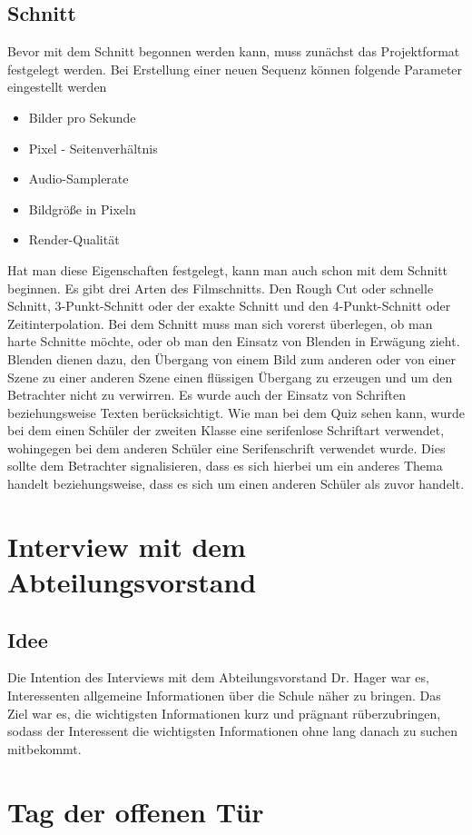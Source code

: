 \subsection{Schnitt}
Bevor mit dem Schnitt begonnen werden kann, muss zunächst das Projektformat festgelegt werden. Bei Erstellung einer neuen Sequenz können folgende Parameter eingestellt werden
\begin{itemize}
	\item Bilder pro Sekunde
	\item Pixel - Seitenverhältnis
	\item Audio-Samplerate
	\item Bildgröße in Pixeln
	\item Render-Qualität
\end{itemize}
Hat man diese Eigenschaften festgelegt, kann man auch schon mit dem Schnitt beginnen. Es gibt drei Arten des Filmschnitts. Den Rough Cut oder schnelle Schnitt, 3-Punkt-Schnitt oder der exakte Schnitt und den 4-Punkt-Schnitt oder Zeitinterpolation. Bei dem Schnitt muss man sich vorerst überlegen, ob man harte Schnitte möchte, oder ob man den Einsatz von Blenden in Erwägung zieht. Blenden dienen dazu, den Übergang von einem Bild zum anderen oder von einer Szene zu einer anderen Szene einen flüssigen Übergang zu erzeugen und um den Betrachter nicht zu verwirren.
Es wurde auch der Einsatz von Schriften beziehungsweise Texten berücksichtigt. Wie man bei dem Quiz sehen kann, wurde bei dem einen Schüler der zweiten Klasse eine serifenlose Schriftart verwendet, wohingegen bei dem anderen Schüler eine Serifenschrift verwendet wurde. Dies sollte dem Betrachter signalisieren, dass es sich hierbei um ein anderes Thema handelt beziehungsweise, dass es sich um einen anderen Schüler als zuvor handelt.
\section{Interview mit dem Abteilungsvorstand}
\subsection{Idee}
Die Intention des Interviews mit dem Abteilungsvorstand Dr. Hager war es, Interessenten allgemeine Informationen über die Schule näher zu bringen. Das Ziel war es, die wichtigsten Informationen kurz und prägnant rüberzubringen, sodass der Interessent die wichtigsten Informationen ohne lang danach zu suchen mitbekommt.
\section{Tag der offenen Tür}

